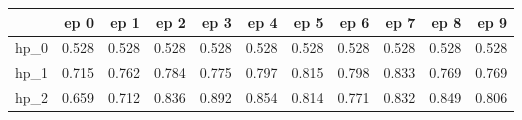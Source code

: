 \begin{tabular}{lrrrrrrrrrr}
\toprule
{} &   ep 0 &   ep 1 &   ep 2 &   ep 3 &   ep 4 &   ep 5 &   ep 6 &   ep 7 &   ep 8 &   ep 9 \\
\midrule
hp\_0 &  0.528 &  0.528 &  0.528 &  0.528 &  0.528 &  0.528 &  0.528 &  0.528 &  0.528 &  0.528 \\
hp\_1 &  0.715 &  0.762 &  0.784 &  0.775 &  0.797 &  0.815 &  0.798 &  0.833 &  0.769 &  0.769 \\
hp\_2 &  0.659 &  0.712 &  0.836 &  0.892 &  0.854 &  0.814 &  0.771 &  0.832 &  0.849 &  0.806 \\
\bottomrule
\end{tabular}
